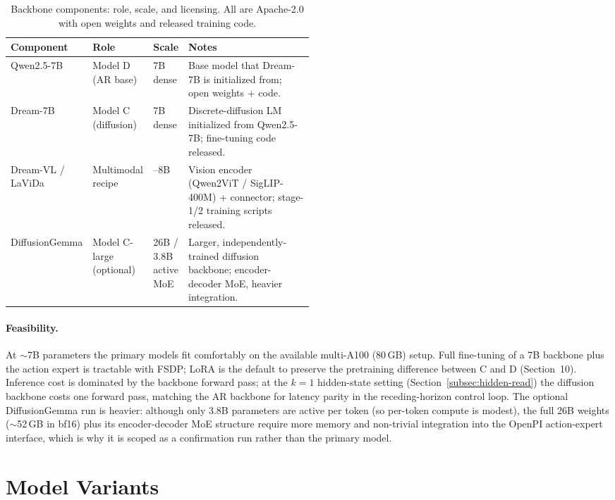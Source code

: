 \documentclass[11pt]{article}
\begin{document}
\begin{table}[h!]
\centering
\caption{Backbone components: role, scale, and licensing. All are Apache-2.0 with open weights and released training code.}
\begin{tabularx}{\linewidth}{>{\raggedright\arraybackslash}p{0.20\linewidth} >{\raggedright\arraybackslash}p{0.20\linewidth} >{\raggedright\arraybackslash}p{0.10\linewidth} X}
\toprule
Component & Role & Scale & Notes \\
\midrule
Qwen2.5-7B & Model D (AR base) & 7B dense & Base model that Dream-7B is initialized from; open weights + code. \\
Dream-7B & Model C (diffusion) & 7B dense & Discrete-diffusion LM initialized from Qwen2.5-7B; fine-tuning code released. \\
Dream-VL / LaViDa & Multimodal recipe & 7--8B & Vision encoder (Qwen2ViT / SigLIP-400M) + connector; stage-1/2 training scripts released. \\
DiffusionGemma & Model C-large (optional) & 26B / 3.8B active MoE & Larger, independently-trained diffusion backbone; encoder-decoder MoE, heavier integration. \\
\bottomrule
\end{tabularx}
\end{table}

\paragraph{Feasibility.} At $\sim$7B parameters the primary models fit comfortably on the available multi-A100 (80\,GB) setup. Full fine-tuning of a 7B backbone plus the action expert is tractable with FSDP; LoRA is the default to preserve the pretraining difference between C and D (Section~10). Inference cost is dominated by the backbone forward pass; at the $k{=}1$ hidden-state setting (Section~\ref{subsec:hidden-read}) the diffusion backbone costs one forward pass, matching the AR backbone for latency parity in the receding-horizon control loop. The optional DiffusionGemma run is heavier: although only 3.8B parameters are active per token (so per-token compute is modest), the full 26B weights ($\sim$52\,GB in bf16) plus its encoder-decoder MoE structure require more memory and non-trivial integration into the OpenPI action-expert interface, which is why it is scoped as a confirmation run rather than the primary model.

\section{Model Variants}
\end{document}
